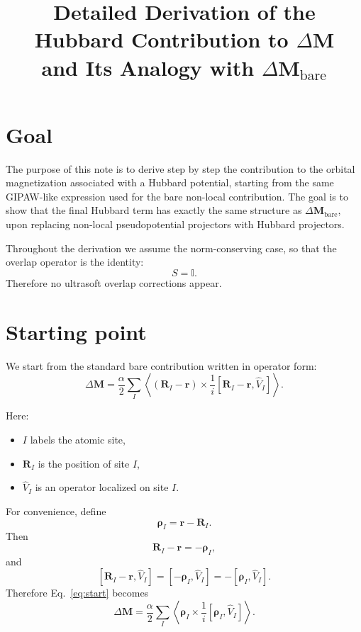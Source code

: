 \documentclass[11pt]{article}
\title{Detailed Derivation of the Hubbard Contribution to $\Delta \mathbf{M}$\\
and Its Analogy with $\Delta \mathbf{M}_{\mathrm{bare}}$}
\author{}
\date{}
\begin{document}
\maketitle

\section{Goal}

The purpose of this note is to derive step by step the contribution to the orbital magnetization associated with a Hubbard potential, starting from the same GIPAW-like expression used for the bare non-local contribution. The goal is to show that the final Hubbard term has exactly the same structure as $\Delta \mathbf{M}_{\mathrm{bare}}$, upon replacing non-local pseudopotential projectors with Hubbard projectors.

Throughout the derivation we assume the norm-conserving case, so that the overlap operator is the identity:
\begin{equation}
S = \mathbb{I}.
\end{equation}
Therefore no ultrasoft overlap corrections appear.

\section{Starting point}

We start from the standard bare contribution written in operator form:
\begin{equation}
\Delta \mathbf{M}
=
\frac{\alpha}{2}
\sum_I
\left\langle
(\mathbf{R}_I-\mathbf{r}) \times \frac{1}{i}
\left[
\mathbf{R}_I-\mathbf{r},\hat V_I
\right]
\right\rangle .
\label{eq:start}
\end{equation}

Here:
\begin{itemize}
\item $I$ labels the atomic site,
\item $\mathbf{R}_I$ is the position of site $I$,
\item $\hat V_I$ is an operator localized on site $I$.
\end{itemize}

For convenience, define
\begin{equation}
\bm{\rho}_I = \mathbf{r}-\mathbf{R}_I.
\label{eq:rho_def}
\end{equation}
Then
\begin{equation}
\mathbf{R}_I-\mathbf{r} = -\bm{\rho}_I,
\end{equation}
and
\begin{equation}
\left[
\mathbf{R}_I-\mathbf{r},\hat V_I
\right]
=
\left[
-\bm{\rho}_I,\hat V_I
\right]
=
-\left[
\bm{\rho}_I,\hat V_I
\right].
\end{equation}
Therefore Eq.~\eqref{eq:start} becomes
\begin{equation}
\Delta \mathbf{M}
=
\frac{\alpha}{2}
\sum_I
\left\langle
\bm{\rho}_I \times \frac{1}{i}
\left[
\bm{\rho}_I,\hat V_I
\right]
\right\rangle .
\label{eq:start_rho}
\end{equation}
\end{document}
